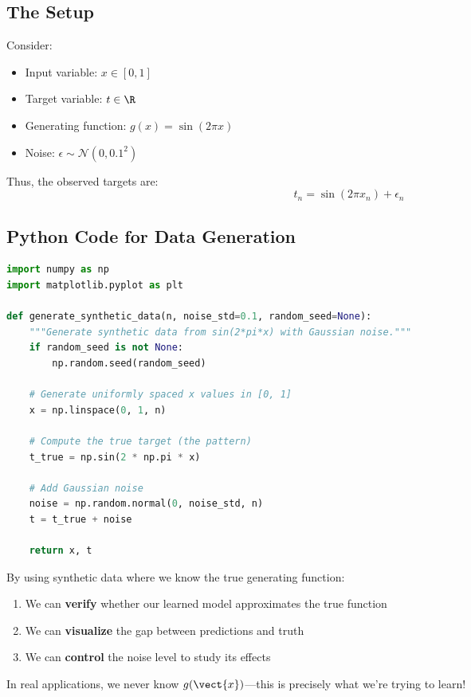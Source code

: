 \subsection{The Setup}

Consider:
\begin{itemize}
    \item Input variable: $x \in [0, 1]$
    \item Target variable: $t \in \R$
    \item Generating function: $g(x) = \sin(2\pi x)$
    \item Noise: $\epsilon \sim \mathcal{N}(0, 0.1^2)$
\end{itemize}

Thus, the observed targets are:
\[
t_n = \sin(2\pi x_n) + \epsilon_n
\]

\subsection{Python Code for Data Generation}

\begin{lstlisting}[language=Python, caption=Synthetic Data Generation]
import numpy as np
import matplotlib.pyplot as plt

def generate_synthetic_data(n, noise_std=0.1, random_seed=None):
    """Generate synthetic data from sin(2*pi*x) with Gaussian noise."""
    if random_seed is not None:
        np.random.seed(random_seed)
    
    # Generate uniformly spaced x values in [0, 1]
    x = np.linspace(0, 1, n)
    
    # Compute the true target (the pattern)
    t_true = np.sin(2 * np.pi * x)
    
    # Add Gaussian noise
    noise = np.random.normal(0, noise_std, n)
    t = t_true + noise
    
    return x, t
\end{lstlisting}

\begin{bluebox}
By using synthetic data where we know the true generating function:
\begin{enumerate}
    \item We can \textbf{verify} whether our learned model approximates the true function
    \item We can \textbf{visualize} the gap between predictions and truth
    \item We can \textbf{control} the noise level to study its effects
\end{enumerate}

In real applications, we never know $g(\vect{x})$---this is precisely what we're trying to learn!
\end{bluebox}

